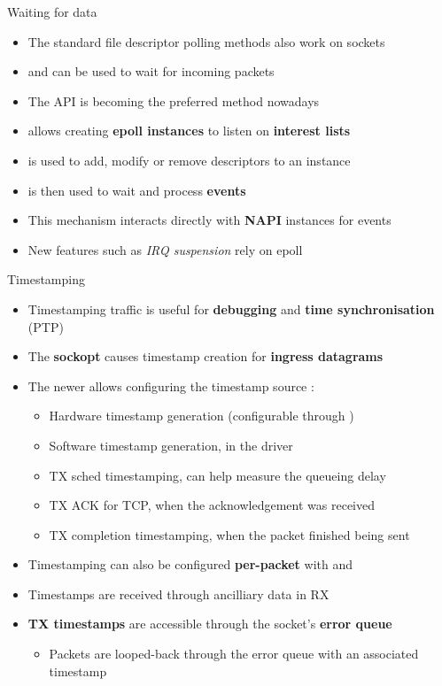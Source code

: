 \begin{frame}{Waiting for data}
	\begin{itemize}
		\item The standard file descriptor polling methods also work on sockets
		\item {} and  can be used to wait for incoming packets
		\item The  API is becoming the preferred method nowadays
		\item {} allows creating \textbf{epoll instances} to listen on \textbf{interest lists}
		\item {} is used to add, modify or remove descriptors to an instance
		\item {} is then used to wait and process \textbf{events}
		\item This mechanism interacts directly with \textbf{NAPI} instances for events
		\item New features such as \textit{IRQ suspension} rely on epoll
	\end{itemize}
\end{frame}

\begin{frame}{Timestamping}
	\begin{itemize}
		\item Timestamping traffic is useful for \textbf{debugging} and \textbf{time synchronisation} (PTP)
		\item The  \textbf{sockopt} causes timestamp creation for \textbf{ingress datagrams}
		\item The newer  allows configuring the timestamp source :
			\begin{itemize}
				\item Hardware timestamp generation (configurable through )
				\item Software timestamp generation, in the driver
				\item TX sched timestamping, can help measure the queueing delay
				\item TX ACK for TCP, when the acknowledgement was received
				\item TX completion timestamping, when the packet finished being sent
			\end{itemize}
		\item Timestamping can also be configured \textbf{per-packet} with  and 
		\item Timestamps are received through  ancilliary data in RX
		\item \textbf{TX timestamps} are accessible through the socket's \textbf{error queue}
			\begin{itemize}
				\item Packets are looped-back through the error queue with an associated timestamp
			\end{itemize}
	\end{itemize}
\end{frame}

